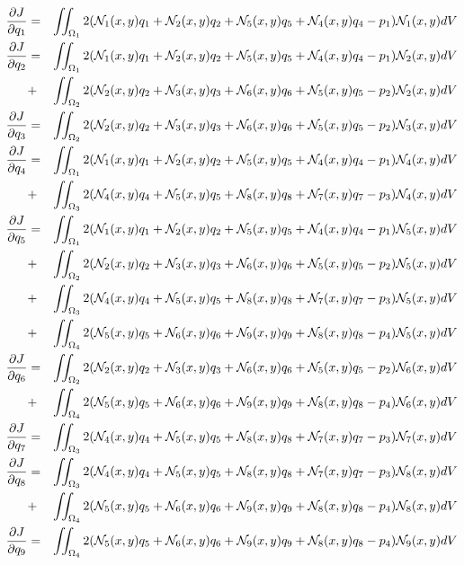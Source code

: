 \begin{eqnarray}
\frac{\partial J}{\partial q_1} 
&=& \iint_{\Omega_1} 2 ({\mathcal{N}}_1(x,y) q_1 + {\mathcal{N}}_2(x,y)q_2 + {\mathcal{N}}_5(x,y)q_5 + {\mathcal{N}}_4(x,y)q_4 -p_1) {\mathcal{N}}_1(x,y) dV \nonumber\\
\frac{\partial J}{\partial q_2}
&=& \iint_{\Omega_1} 2({\mathcal{N}}_1(x,y) q_1 + {\mathcal{N}}_2(x,y)q_2 + {\mathcal{N}}_5(x,y)q_5 + {\mathcal{N}}_4(x,y)q_4 -p_1) {\mathcal{N}}_2(x,y) dV \nonumber\\
&+& \iint_{\Omega_2} 2({\mathcal{N}}_2(x,y) q_2 + {\mathcal{N}}_3(x,y)q_3 + {\mathcal{N}}_6(x,y)q_6 + {\mathcal{N}}_5(x,y)q_5 -p_2) {\mathcal{N}}_2(x,y) dV \nonumber\\
\frac{\partial J}{\partial q_3}
&=& \iint_{\Omega_2} 2({\mathcal{N}}_2(x,y) q_2 + {\mathcal{N}}_3(x,y)q_3 + {\mathcal{N}}_6(x,y)q_6 + {\mathcal{N}}_5(x,y)q_5 -p_2) {\mathcal{N}}_3(x,y) dV \nonumber\\
\frac{\partial J}{\partial q_4}
&=& \iint_{\Omega_1} 2({\mathcal{N}}_1(x,y) q_1 + {\mathcal{N}}_2(x,y)q_2 + {\mathcal{N}}_5(x,y)q_5 + {\mathcal{N}}_4(x,y)q_4 -p_1) {\mathcal{N}}_4(x,y) dV \nonumber\\
&+& \iint_{\Omega_3} 2({\mathcal{N}}_4(x,y) q_4 + {\mathcal{N}}_5(x,y)q_5 + {\mathcal{N}}_8(x,y)q_8 + {\mathcal{N}}_7(x,y)q_7 -p_3) {\mathcal{N}}_4(x,y) dV \nonumber\\
\frac{\partial J}{\partial q_5}
&=& \iint_{\Omega_1} 2({\mathcal{N}}_1(x,y) q_1 + {\mathcal{N}}_2(x,y)q_2 + {\mathcal{N}}_5(x,y)q_5 + {\mathcal{N}}_4(x,y)q_4 -p_1) {\mathcal{N}}_5(x,y) dV \nonumber\\
&+& \iint_{\Omega_2} 2({\mathcal{N}}_2(x,y) q_2 + {\mathcal{N}}_3(x,y)q_3 + {\mathcal{N}}_6(x,y)q_6 + {\mathcal{N}}_5(x,y)q_5 -p_2) {\mathcal{N}}_5(x,y) dV \nonumber\\
&+& \iint_{\Omega_3} 2({\mathcal{N}}_4(x,y) q_4 + {\mathcal{N}}_5(x,y)q_5 + {\mathcal{N}}_8(x,y)q_8 + {\mathcal{N}}_7(x,y)q_7 -p_3) {\mathcal{N}}_5(x,y) dV \nonumber\\
&+& \iint_{\Omega_4} 2({\mathcal{N}}_5(x,y) q_5 + {\mathcal{N}}_6(x,y)q_6 + {\mathcal{N}}_9(x,y)q_9 + {\mathcal{N}}_8(x,y)q_8 -p_4) {\mathcal{N}}_5(x,y) dV \nonumber\\
\frac{\partial J}{\partial q_6}
&=& \iint_{\Omega_2} 2({\mathcal{N}}_2(x,y) q_2 + {\mathcal{N}}_3(x,y)q_3 + {\mathcal{N}}_6(x,y)q_6 + {\mathcal{N}}_5(x,y)q_5 -p_2) {\mathcal{N}}_6(x,y) dV \nonumber\\
&+& \iint_{\Omega_4} 2({\mathcal{N}}_5(x,y) q_5 + {\mathcal{N}}_6(x,y)q_6 + {\mathcal{N}}_9(x,y)q_9 + {\mathcal{N}}_8(x,y)q_8 -p_4) {\mathcal{N}}_6(x,y) dV \nonumber\\
\frac{\partial J}{\partial q_7}
&=& \iint_{\Omega_3} 2({\mathcal{N}}_4(x,y) q_4 + {\mathcal{N}}_5(x,y)q_5 + {\mathcal{N}}_8(x,y)q_8 + {\mathcal{N}}_7(x,y)q_7 -p_3) {\mathcal{N}}_7(x,y) dV \nonumber\\
\frac{\partial J}{\partial q_8}
&=& \iint_{\Omega_3} 2({\mathcal{N}}_4(x,y) q_4 + {\mathcal{N}}_5(x,y)q_5 + {\mathcal{N}}_8(x,y)q_8 + {\mathcal{N}}_7(x,y)q_7 -p_3) {\mathcal{N}}_8(x,y)dV \nonumber\\
&+& \iint_{\Omega_4} 2({\mathcal{N}}_5(x,y) q_5 + {\mathcal{N}}_6(x,y)q_6 + {\mathcal{N}}_9(x,y)q_9 + {\mathcal{N}}_8(x,y)q_8 -p_4) {\mathcal{N}}_8(x,y)dV \nonumber\\ 
\frac{\partial J}{\partial q_9}
&=& \iint_{\Omega_4} 2({\mathcal{N}}_5(x,y) q_5 + {\mathcal{N}}_6(x,y)q_6 + {\mathcal{N}}_9(x,y)q_9 + {\mathcal{N}}_8(x,y)q_8 -p_4) {\mathcal{N}}_9(x,y)dV 
\end{eqnarray}
